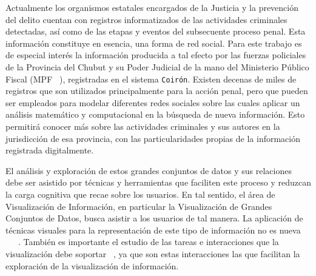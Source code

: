 Actualmente los organismos estatales encargados de la Justicia y la prevención del delito cuentan con registros informatizados de las actividades criminales detectadas, así como de las etapas y eventos del subsecuente proceso penal. Esta información constituye en esencia, una forma de red social. Para este trabajo es de especial interés la información producida a tal efecto por las fuerzas policiales de la Provincia del Chubut y su Poder Judicial de la mano del Ministerio Público Fiscal (MPF ~\cite{MPFChubutPaginaWeb}), registradas en el sistema \texttt{Coirón}. Existen decenas de miles de registros que son utilizados principalmente para la acción penal, pero que pueden ser empleados para modelar diferentes redes sociales sobre las cuales aplicar un análisis matemático y computacional en la búsqueda de nueva información. Esto permitirá conocer más sobre las actividades criminales y sus autores en la jurisdicción de esa provincia, con las particularidades propias de la información registrada digitalmente.

El análisis y exploración de estos grandes conjuntos de datos y sus relaciones debe ser asistido por técnicas y herramientas que faciliten este proceso y reduzcan la carga cognitiva que recae sobre los usuarios. En tal sentido, el área de Visualización de Información, en particular la Visualización de Grandes Conjuntos de Datos, busca asistir a los usuarios de tal manera. La aplicación de técnicas visuales para la representación de este tipo de información no es nueva ~\cite{xu2005criminal}~\cite{feng2019big}~\cite{mathew2021criminal}. También es importante el estudio de las tareas e interacciones que la visualización debe soportar ~\cite{chen2005visualization}, ya que son estas interacciones las que facilitan la exploración de la visualización de información.
